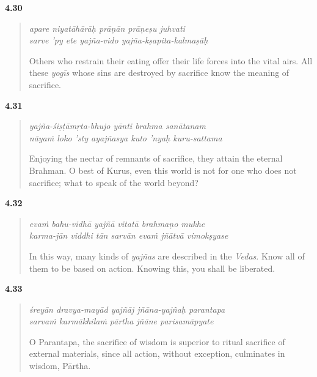 \par\noindent\textbf{4.30}\par
\begin{verse}
\textit{apare niyatāhārāḥ prāṇān prāṇeṣu juhvati} \\
\textit{sarve ’py ete yajña-vido yajña-kṣapita-kalmaṣāḥ}

\noindent Others who restrain their eating offer their life forces into the vital airs. All these \textit{yogīs} whose sins are destroyed by sacrifice know the meaning of sacrifice.
\end{verse}
\par



\par\noindent\textbf{4.31}\par
\begin{verse}
\textit{yajña-śiṣṭāmṛta-bhujo yānti brahma sanātanam} \\
\textit{nāyaṁ loko ’sty ayajñasya kuto ’nyaḥ kuru-sattama}

\noindent Enjoying the nectar of remnants of sacrifice, they attain the eternal Brahman. O best of Kurus, even this world is not for one who does not sacrifice; what to speak of the world beyond?
\end{verse}
\par



\par\noindent\textbf{4.32}\par
\begin{verse}
\textit{evaṁ bahu-vidhā yajñā vitatā brahmaṇo mukhe} \\
\textit{karma-jān viddhi tān sarvān evaṁ jñātvā vimokṣyase}

\noindent In this way, many kinds of \textit{yajñas} are described in the \textit{Vedas}. Know all of them to be based on action. Knowing this, you shall be liberated.
\end{verse}
\par



\par\noindent\textbf{4.33}\par
\begin{verse}
\textit{śreyān dravya-mayād yajñāj jñāna-yajñaḥ parantapa} \\
\textit{sarvaṁ karmākhilaṁ pārtha jñāne parisamāpyate}

\noindent O Parantapa, the sacrifice of wisdom is superior to ritual sacrifice of external materials, since all action, without exception, culminates in wisdom, Pārtha.
\end{verse}
\par


